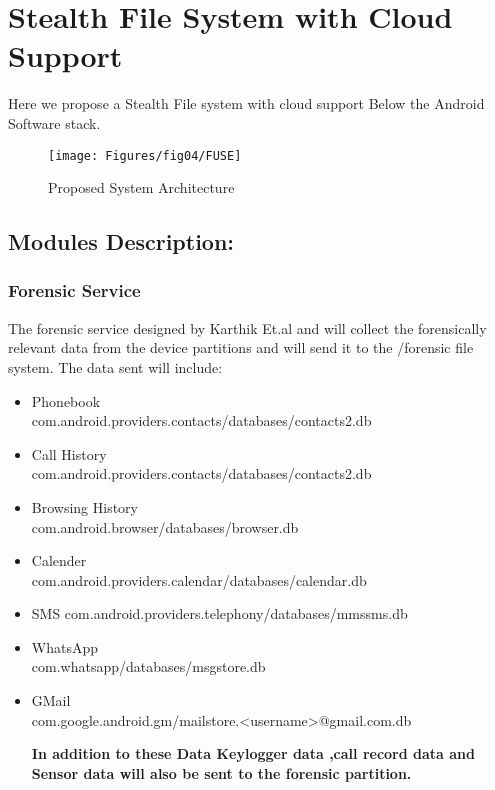 \chapter{Stealth File System with Cloud Support}
\label{chap:proposal}
Here we propose a Stealth File system with cloud support  Below the Android  Software stack.
\begin{figure}[H]
   \centering
   \texttt{[image: Figures/fig04/FUSE]}
   \caption{Proposed System Architecture}
  \end{figure}
  
 \section{ Modules Description:}
 
\subsection{Forensic Service}
The forensic service designed by Karthik \cite{Karthik2016} Et.al and  \cite{Aiyyappan2015} will collect the forensically relevant data from the device partitions and will send it to the /forensic file system. The data sent will include:
\begin{itemize}
\item Phonebook\\
  com.android.providers.contacts/databases/contacts2.db
\item Call History\\ com.android.providers.contacts/databases/contacts2.db
\item Browsing History\\ com.android.browser/databases/browser.db
\item Calender\\ com.android.providers.calendar/databases/calendar.db
\item SMS com.android.providers.telephony/databases/mmssms.db
\item WhatsApp\\ com.whatsapp/databases/msgstore.db
\item GMail\\ com.google.android.gm/mailstore.<username>@gmail.com.db

\textbf{In addition to these Data Keylogger data ,call record data and Sensor data will also be sent to the forensic partition.}
\end{itemize}
